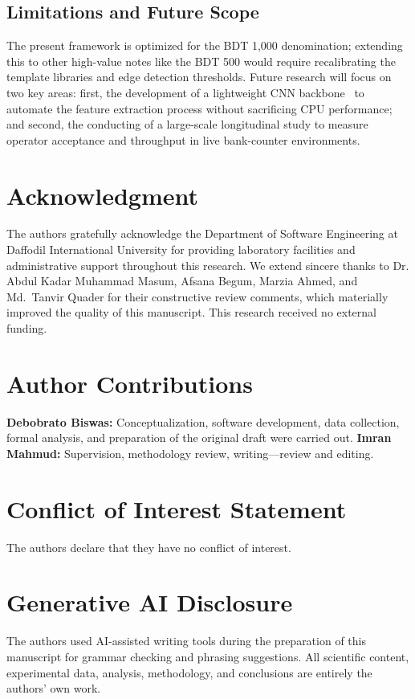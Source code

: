 \documentclass[journal]{IEEEtran}
\begin{document}
\subsection{Limitations and Future Scope}

The present framework is optimized for the BDT 1,000 denomination; extending this to other high-value notes like the BDT 500 would require recalibrating the template libraries and edge detection thresholds. Future research will focus on two key areas: first, the development of a lightweight CNN backbone~\cite{sandler2018mobilenetv2} to automate the feature extraction process without sacrificing CPU performance; and second, the conducting of a large-scale longitudinal study to measure operator acceptance and throughput in live bank-counter environments.

\section*{Acknowledgment}
The authors gratefully acknowledge the Department of Software Engineering at Daffodil International University for providing laboratory facilities and administrative support throughout this research. We extend sincere thanks to Dr. Abdul Kadar Muhammad Masum, Afsana Begum, Marzia Ahmed, and Md.~Tanvir Quader for their constructive review comments, which materially improved the quality of this manuscript. This research received no external funding.

\section*{Author Contributions}
\textbf{Debobrato Biswas:} Conceptualization, software development, data collection, formal analysis, and preparation of the original draft were carried out. \textbf{Imran Mahmud:} Supervision, methodology review, writing---review and editing.

\section*{Conflict of Interest Statement}
The authors declare that they have no conflict of interest.

\section*{Generative AI Disclosure}
The authors used AI-assisted writing tools during the preparation of this manuscript for grammar checking and phrasing suggestions. All scientific content, experimental data, analysis, methodology, and conclusions are entirely the authors' own work.
\end{document}
